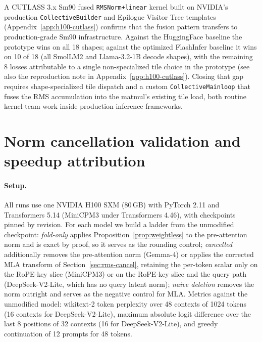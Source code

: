 \documentclass{article}
\begin{document}
A CUTLASS 3.x Sm90 fused \texttt{RMSNorm+linear} kernel built on NVIDIA's production \texttt{CollectiveBuilder} and Epilogue Visitor Tree templates (Appendix~\ref{app:h100-cutlass}) confirms that the fusion pattern transfers to production-grade Sm90 infrastructure. Against the HuggingFace baseline the prototype wins on all 18 shapes; against the optimized FlashInfer baseline it wins on 10 of 18 (all SmolLM2 and Llama-3.2-1B decode shapes), with the remaining 8 losses attributable to a single non-specialized tile choice in the prototype (see also the reproduction note in Appendix~\ref{app:h100-cutlass}). Closing that gap requires shape-specialized tile dispatch and a custom \texttt{CollectiveMainloop} that fuses the RMS accumulation into the matmul's existing tile load, both routine kernel-team work inside production inference frameworks.

\section{Norm cancellation validation and speedup attribution}\label{app:cancel}

\paragraph{Setup.} All runs use one NVIDIA H100 SXM (80\,GB) with PyTorch 2.11 and Transformers 5.14 (MiniCPM3 under Transformers 4.46), with checkpoints pinned by revision. For each model we build a ladder from the unmodified checkpoint: \emph{fold-only} applies Proposition~\ref{prop:weightless} to the pre-attention norm and is exact by proof, so it serves as the rounding control; \emph{cancelled} additionally removes the pre-attention norm (Gemma-4) or applies the corrected MLA transform of Section~\ref{sec:rms-cancel}, retaining the per-token scalar only on the RoPE-key slice (MiniCPM3) or on the RoPE-key slice and the query path (DeepSeek-V2-Lite, which has no query latent norm); \emph{naive deletion} removes the norm outright and serves as the negative control for MLA. Metrics against the unmodified model: wikitext-2 token perplexity over 48 contexts of 1024 tokens (16 contexts for DeepSeek-V2-Lite), maximum absolute logit difference over the last 8 positions of 32 contexts (16 for DeepSeek-V2-Lite), and greedy continuation of 12 prompts for 48 tokens.
\end{document}
